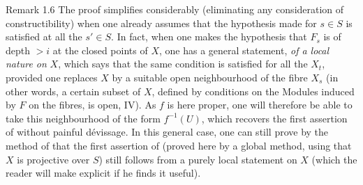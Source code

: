 \label{XII.1.6}
\begin{enonce*}[remark]{Remark 1.6\sfootnotemark}  The proof simplifies considerably (eliminating any consideration of constructibility) when one already assumes that the hypothesis made for $s\in S$ is satisfied at all the $s'\in S$. In fact, when one makes the hypothesis that $F_s$ is of depth $>i$ at the closed points of $X$, one has a general statement, \emph{of a local nature on} $X$, which says that the same condition is satisfied for all the $X_t$, provided one replaces $X$ by a suitable open neighbourhood of the fibre $X_s$ (in other words, a certain subset of $X$, defined by conditions on the Modules induced by $F$ on the fibres, is open, \cf \EGA IV). As $f$ is here proper, one will therefore be able to take this neighbourhood of the form $f^{-1}(U)$, which recovers the first assertion of  without painful d\'evissage. In this general case, one can still prove by the method of \loccit that the first assertion of  (proved here by a global method, using that $X$ is projective over $S$) still follows from a purely local statement on $X$ (which the reader will make explicit if he finds it useful).
\end{enonce*}
